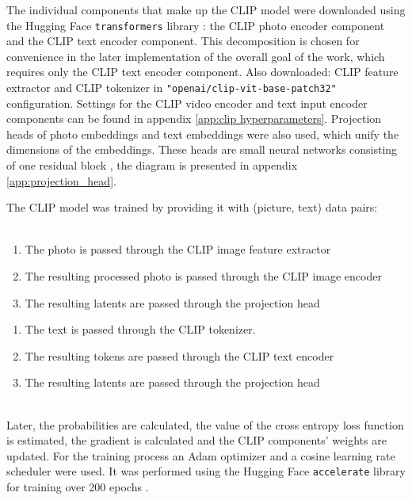 \documentclass[runningheads]{llncs}
\begin{document}
The individual components that make up the CLIP model were downloaded using the Hugging Face \texttt{transformers} library \cite{wolf-etal-2020-transformers}: the CLIP photo encoder component and the CLIP text encoder component. This decomposition is chosen for convenience in the later implementation of the overall goal of the work, which requires only the CLIP text encoder component. Also downloaded: CLIP feature extractor and CLIP tokenizer in \texttt{"openai/clip-vit-base-patch32"} configuration. Settings for the CLIP video encoder and text input encoder components can be found in appendix \ref{app:clip hyperparameters}. Projection heads of photo embeddings and text embeddings were also used, which unify the dimensions of the embeddings. These heads are small neural networks consisting of one residual block \cite{ResNet}, the diagram is presented in appendix \ref{app:projection_head}.
\\\par
The CLIP model was trained by providing it with (picture, text) data pairs:\\
\\
\begin{minipage}{0.47\textwidth}
    \begin{enumerate}
        \item The photo is passed through the CLIP image feature extractor
        \item The resulting processed photo is passed through the CLIP image encoder
        \item The resulting latents are passed through the projection head
    \end{enumerate}
\end{minipage}
\hfill
\begin{minipage}{0.47\textwidth}
    \begin{enumerate}
        \item The text is passed through the CLIP tokenizer.
        \item The resulting tokens are passed through the CLIP text encoder
        \item The resulting latents are passed through the projection head
    \end{enumerate}
\end{minipage}
\vspace{0.5cm} \\
Later, the probabilities are calculated, the value of the cross entropy loss function is estimated, the gradient is calculated and the CLIP components' weights are updated. For the training process an Adam optimizer \cite{Adam} and a cosine learning rate scheduler \cite{CosineScheduler} were used. It was performed using the Hugging Face \texttt{accelerate} library for training over 200 epochs \cite{accelerate}.
\end{document}
